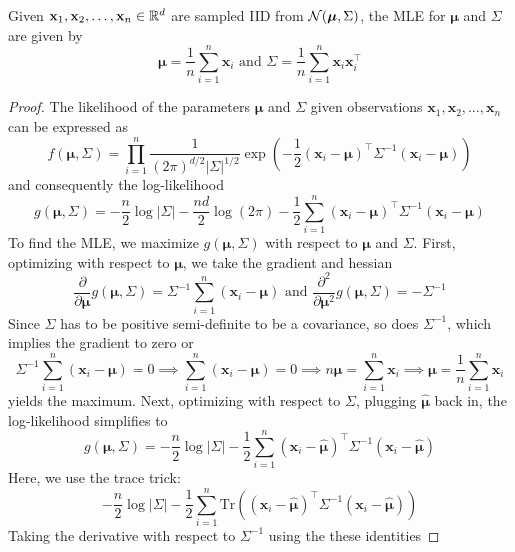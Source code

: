 \begin{theorem}
    Given $\mathbf{x}_1,\mathbf{x}_2,\dots,\mathbf{x}_n\in\mathbb{R}^d$ are sampled IID from $\mathcal{N}(\boldsymbol{\mu},\Sigma)$, the MLE for $\boldsymbol{\mu}$ and $\Sigma$ are given by
    \[ 
        \boldsymbol{\mu} = \frac{1}{n} \sum_{i=1}^n \mathbf{x}_i \text{ and } \Sigma = \frac{1}{n} \sum_{i=1}^n \mathbf{x}_i \mathbf{x}_i^\top
    \]
\end{theorem}
\begin{proof}
    The likelihood of the parameters $\boldsymbol{\mu}$ and $\Sigma$ given observations $\mathbf{x}_1,\mathbf{x}_2,\dots,\mathbf{x}_n$ can be expressed as
    \[
    f(\boldsymbol{\mu},\Sigma) = \prod_{i=1}^n \frac{1}{(2\pi)^{d/2}|\Sigma|^{1/2}} \exp\left( -\frac{1}{2} (\mathbf{x}_i - \boldsymbol{\mu})^\top \Sigma^{-1} (\mathbf{x}_i - \boldsymbol{\mu}) \right)
    \]
    and consequently the log-likelihood
    \[
    g(\boldsymbol{\mu},\Sigma) = -\frac{n}{2} \log |\Sigma| - \frac{nd}{2} \log(2\pi) - \frac{1}{2} \sum_{i=1}^n (\mathbf{x}_i - \boldsymbol{\mu})^\top \Sigma^{-1} (\mathbf{x}_i - \boldsymbol{\mu})
    \]
    To find the MLE, we maximize $g(\boldsymbol{\mu},\Sigma)$ with respect to $\boldsymbol{\mu}$ and $\Sigma$. First, optimizing with respect to $\boldsymbol{\mu}$, we take the gradient and hessian
    \[
    \frac{\partial}{\partial \boldsymbol{\mu}} g(\boldsymbol{\mu},\Sigma) = \Sigma^{-1} \sum_{i=1}^n (\mathbf{x}_i - \boldsymbol{\mu})
    \text{ and }
    \frac{\partial^2}{\partial \boldsymbol{\mu}^2} g(\boldsymbol{\mu},\Sigma) = -\Sigma^{-1}
    \]
    Since $\Sigma$ has to be positive semi-definite to be a covariance, so does $\Sigma^{-1}$, which implies the gradient to zero or
    \[
    \Sigma^{-1} \sum_{i=1}^n (\mathbf{x}_i - \boldsymbol{\mu}) = 0
    \implies
    \sum_{i=1}^n (\mathbf{x}_i - \boldsymbol{\mu}) = 0
    \implies
    n\boldsymbol{\mu} = \sum_{i=1}^n \mathbf{x}_i
    \implies
    \boldsymbol{\mu} = \frac{1}{n} \sum_{i=1}^n \mathbf{x}_i
    \]
    yields the maximum. Next, optimizing with respect to $\Sigma$, plugging $\hat{\boldsymbol{\mu}}$ back in, the log-likelihood simplifies to
    \[
    g(\boldsymbol{\mu},\Sigma) = -\frac{n}{2} \log |\Sigma| - \frac{1}{2} \sum_{i=1}^n (\mathbf{x}_i - \hat{\boldsymbol{\mu}})^\top \Sigma^{-1} (\mathbf{x}_i - \hat{\boldsymbol{\mu}})
    \]
    Here, we use the trace trick:
    \[
    -\frac{n}{2} \log |\Sigma| - \frac{1}{2} \sum_{i=1}^n \text{Tr}\left((\mathbf{x}_i - \hat{\boldsymbol{\mu}})^\top \Sigma^{-1} (\mathbf{x}_i - \hat{\boldsymbol{\mu}})\right)
    \]
    Taking the derivative with respect to $\Sigma^{-1}$ using the these identities

\end{proof}
